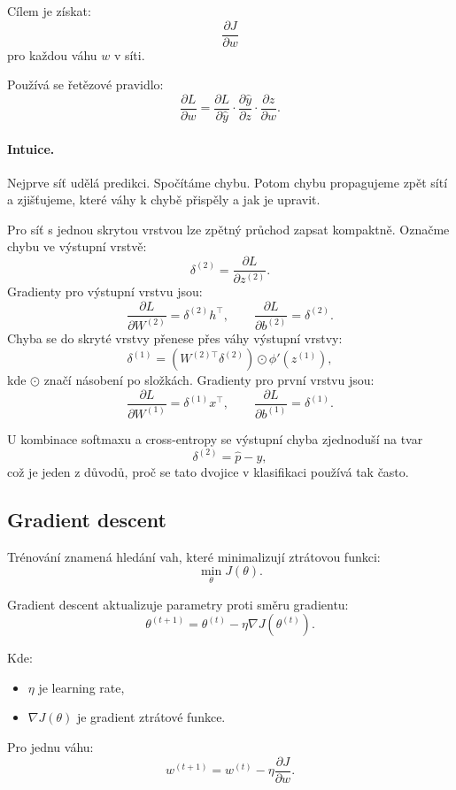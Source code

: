 Cílem je získat:
\[
\frac{\partial J}{\partial w}
\]
pro každou váhu $w$ v síti.

Používá se řetězové pravidlo:
\[
\frac{\partial L}{\partial w}
=
\frac{\partial L}{\partial \hat{y}}
\cdot
\frac{\partial \hat{y}}{\partial z}
\cdot
\frac{\partial z}{\partial w}.
\]

\paragraph{Intuice.}
Nejprve síť udělá predikci. Spočítáme chybu. Potom chybu propagujeme zpět sítí a zjišťujeme, které váhy
k chybě přispěly a jak je upravit.

Pro síť s jednou skrytou vrstvou lze zpětný průchod zapsat kompaktně. Označme chybu ve výstupní vrstvě:
\[
\delta^{(2)}
=
\frac{\partial L}{\partial z^{(2)}}.
\]
Gradienty pro výstupní vrstvu jsou:
\[
\frac{\partial L}{\partial W^{(2)}}=\delta^{(2)}h^\top,
\qquad
\frac{\partial L}{\partial b^{(2)}}=\delta^{(2)}.
\]
Chyba se do skryté vrstvy přenese přes váhy výstupní vrstvy:
\[
\delta^{(1)}
=
\left(W^{(2)\top}\delta^{(2)}\right)
\odot
\phi'(z^{(1)}),
\]
kde $\odot$ značí násobení po složkách. Gradienty pro první vrstvu jsou:
\[
\frac{\partial L}{\partial W^{(1)}}=\delta^{(1)}x^\top,
\qquad
\frac{\partial L}{\partial b^{(1)}}=\delta^{(1)}.
\]

U kombinace softmaxu a cross-entropy se výstupní chyba zjednoduší na tvar
\[
\delta^{(2)}=\hat{p}-y,
\]
což je jeden z důvodů, proč se tato dvojice v klasifikaci používá tak často.

\subsection{Gradient descent}

Trénování znamená hledání vah, které minimalizují ztrátovou funkci:
\[
\min_{\theta} J(\theta).
\]

Gradient descent aktualizuje parametry proti směru gradientu:
\[
\theta^{(t+1)}
=
\theta^{(t)}
-
\eta
\nabla J(\theta^{(t)}).
\]

Kde:
\begin{itemize}
    \item $\eta$ je learning rate,
    \item $\nabla J(\theta)$ je gradient ztrátové funkce.
\end{itemize}

Pro jednu váhu:
\[
w^{(t+1)}
=
w^{(t)}
-
\eta
\frac{\partial J}{\partial w}.
\]

